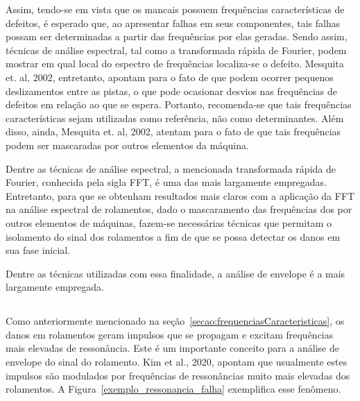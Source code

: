 \documentclass[
	12pt,				
	oneside,			
	a4paper,			
	english,			
	brazil,			
	]{abntex2ppgsi}
\begin{document}
Assim, tendo-se em vista que os mancais possuem frequências características de defeitos, é esperado que, ao apresentar falhas em seus componentes, tais falhas possam ser determinadas a partir das frequências por elas geradas. Sendo assim, técnicas de análise espectral, tal como a transformada rápida de Fourier, podem mostrar em qual local do espectro de frequências localiza-se o defeito. Mesquita et. al, 2002, entretanto, apontam para o fato de que podem ocorrer pequenos deslizamentos entre as pistas, o que pode ocasionar desvios nas frequências de defeitos em relação ao que se espera. Portanto, recomenda-se que tais frequências características sejam utilizadas como referência, não como determinantes. Além disso, ainda, Mesquita et. al, 2002, atentam para o fato de que tais frequências podem ser mascaradas por outros elementos da máquina.

Dentre as técnicas de análise espectral, a mencionada transformada rápida de Fourier, conhecida pela sigla FFT, é uma das mais largamente empregadas. Entretanto, para que se obtenham resultados mais claros com a aplicação da FFT na análise espectral de rolamentos, dado o mascaramento das frequências dos por outros elementos de máquinas, fazem-se necessárias técnicas que permitam o isolamento do sinal dos rolamentos a fim de que se possa detectar os danos em sua fase inicial. 

Dentre as técnicas utilizadas com essa finalidade, a análise de envelope é a mais largamente empregada. 

\subsection{}

Como anteriormente mencionado na seção~\ref{secao:frequenciasCaracteristicas}, os danos em rolamentos geram impulsos que se propagam e excitam frequências mais elevadas de ressonância. Este é um importante conceito para a análise de envelope do sinal do rolamento. Kim et al., 2020, apontam que usualmente estes impulsos são modulados por frequências de ressonâncias muito mais elevadas dos rolamentos. A Figura~\ref{exemplo_ressonancia_falha} exemplifica esse fenômeno.
\end{document}

